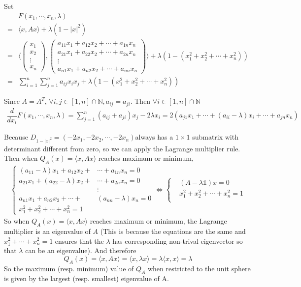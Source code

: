 \documentclass[a4paper,12pt,titlepage]{article}
\begin{document}
Set 
\begin{align*}
&F(x_1,\cdots,x_n,\lambda)\\
=&\langle x,Ax\rangle+\lambda(1-|x|^2)\\
=&\langle\left(\begin{array}{c}
x_1\\
x_2\\
\vdots\\
x_n
\end{array}\right),\left(\begin{array}{c}
a_{11}x_1+a_{12}x_2+\cdots +a_{1n}x_n\\
a_{21}x_1+a_{22}x_2+\cdots +a_{2n}x_n\\
\vdots\\
a_{n1}x_1+a_{n2}x_2+\cdots +a_{nn}x_n
\end{array}\right)\rangle+\lambda(1-(x_1^2+x_2^2+\cdots+x_n^2))\\
=&\sum\limits_{i=1}^n\sum\limits_{j=1}^na_{ij}x_ix_j+\lambda(1-(x_1^2+x_2^2+\cdots+x_n^2))
\end{align*}

Since $A=A^T$, $\forall i,j\in[1,n]\cap\mathbb{N}, a_{ij}=a_{ji}$. Then $\forall i\in[1,n]\cap\mathbb{N}$
\begin{align*}
\dfrac{d}{dx_i}F(x_1,\cdots,x_n,\lambda)
=\sum\limits_{j=1}^n(a_{ij}+a_{ji})x_j-2\lambda x_i=2(a_{j1}x_1+\cdots+(a_{ii}-\lambda)x_i+\cdots+a_{jn}x_n)
\end{align*}

Because $D_{1-|x|^2}=(-2x_1,-2x_2,\cdots,-2x_n)$always has a $1 \times 1$ submatrix with determinant different from
zero, so we can apply the Lagrange multiplier rule. Then when $Q_A(x)=\langle x,Ax\rangle$ reaches maximum or minimum, 
\begin{align*}
\left\{
\begin{aligned}
(a_{11}-\lambda)x_1+a_{12}x_2+&\cdots+a_{1n}x_n=0\\
a_{21}x_1+(a_{22}-\lambda)x_2+&\cdots+a_{2n}x_n=0\\
&\vdots\\
a_{n1}x_1+a_{n2}x_2+\cdots+&(a_{nn}-\lambda) x_n=0\\
x_1^2+x_2^2+\cdots+x_n^2=1
\end{aligned}
\right.\Leftrightarrow \left\{
\begin{aligned}
&(A-\lambda\mathds{1})x=0\\
&x_1^2+x_2^2+\cdots+x_n^2=1\\
\end{aligned}
\right.
\end{align*}
So when $Q_A(x)=\langle x,Ax\rangle$ reaches maximum or minimum, the Lagrange multiplier is an eigenvalue of $A$ (This is because the equations are the same and $x_1^2+\cdots +x_n^2=1 $ ensures that the $\lambda$ has corresponding non-trival eigenvector so that $\lambda$ can be an eigenvalue). And therefore
$$Q_A(x)=\langle x,Ax\rangle=\langle x,\lambda x\rangle=\lambda\langle x,x\rangle=\lambda$$
So the maximum (resp. minimum) value of $Q_A$ when restricted to the unit
sphere is given by the largest (resp. smallest) eigenvalue of A.
\end{document}
